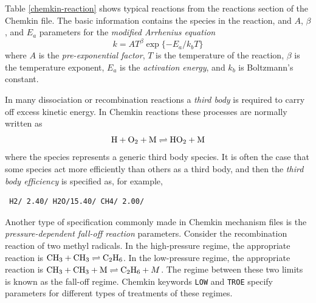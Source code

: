 Table \ref{chemkin-reaction} shows typical reactions from the
reactions section of the Chemkin file. The basic information contains
the species in the reaction, and $A$, $\beta$, and $E_a$ parameters
for the \emph{modified Arrhenius equation}
\begin{equation}
 k=AT^\beta\exp\{-E_a/k_bT\}
\end{equation}
where $A$ is the \emph{pre-exponential factor}, $T$ is the temperature
of the reaction, $\beta$ is the temperature exponent, $E_a$ is the
\emph{activation energy}, and $k_b$ is Boltzmann's constant.

In many dissociation or recombination reactions a \emph{third body} is
required to carry off excess kinetic energy. In Chemkin reactions
these processes are normally written as
\begin{equation}
 \mathrm{H} + \mathrm{O_2} + \mathrm{M} \rightleftharpoons \mathrm{HO_2} + \mathrm{M}
\end{equation}
where the species  represents a generic third body species. It
is often the case that some species act more efficiently than others
as a third body, and then the \emph{third body efficiency} is
specified as, for example,
\begin{verbatim}
 H2/ 2.40/ H2O/15.40/ CH4/ 2.00/
\end{verbatim}

Another type of specification commonly made in Chemkin mechanism files
is the \emph{pressure-dependent fall-off reaction}
parameters. Consider the recombination reaction of two methyl
radicals. In the high-pressure regime, the appropriate reaction is
$\mathrm{CH_3}+\mathrm{CH_3}\rightleftharpoons\mathrm{C_2H_6}$. In the
low-pressure regime, the appropriate reaction is 
$\mathrm{CH_3}+\mathrm{CH_3}+\mathrm{M}\rightleftharpoons\mathrm{C_2H_6}+M$.
The regime between these two limits is known as the fall-off regime.
Chemkin keywords \verb:LOW: and \verb:TROE: specify parameters for
different types of treatments of these regimes.



